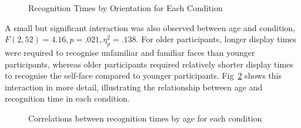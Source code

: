 \documentclass[
  10pt,
  letterpaper,
]{article}
\begin{document}
\label{cell-fig-recognition-times}
\begin{figure}[H]


\caption{\label{fig-recognition-times}Recognition Times by Orientation
for Each Condition}

\end{figure}%

A small but significant interaction was also observed between age and
condition, \(F(2, 52) = 4.16, p = .021, \eta_p^2 = .138\). For older
participants, longer display times were required to recognise unfamiliar
and familiar faces than younger participants, whereas older participants
required relatively shorter display times to recognise the self-face
compared to younger participants. Fig~\ref{fig-correlations} shows this
interaction in more detail, illustrating the relationship between age
and recognition time in each condition.

\label{cell-fig-correlations}
\begin{figure}[H]


\caption{\label{fig-correlations}Correlations between recognition times
by age for each condition}

\end{figure}%
\end{document}

